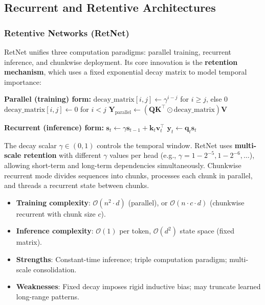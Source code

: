 \documentclass[11pt,a4paper]{article}
\begin{document}
\subsection{Recurrent and Retentive Architectures}

\subsubsection{Retentive Networks (RetNet)}
RetNet \citep{sun_retentive_2023} unifies three computation paradigms: parallel training, recurrent inference, and chunkwise deployment. Its core innovation is the \textbf{retention mechanism}, which uses a fixed exponential decay matrix to model temporal importance:

\begin{algorithmic}[1]
\State \textbf{Parallel (training) form:}
\State $\text{decay\_matrix}[i,j] \gets \gamma^{i-j}$ for $i \geq j$, else $0$ 
\State $\text{decay\_matrix}[i,j] \gets 0$ for $i < j$ 
\State $\mathbf{Y}_{\text{parallel}} \gets (\mathbf{Q}\mathbf{K}^\top \odot \text{decay\_matrix}) \mathbf{V}$ 
\end{algorithmic}

\begin{algorithmic}[1]
\State \textbf{Recurrent (inference) form:}
    \State $\mathbf{s}_t \gets \gamma \mathbf{s}_{t-1} + \mathbf{k}_t \mathbf{v}_t^\top$ 
    \State $\mathbf{y}_t \gets \mathbf{q}_t \mathbf{s}_t$ 
\EndFor
\end{algorithmic}

The decay scalar $\gamma \in (0,1)$ controls the temporal window. RetNet uses \textbf{multi-scale retention} with different $\gamma$ values per head (e.g., $\gamma = 1 - 2^{-5}, 1 - 2^{-6}, \ldots$), allowing short-term and long-term dependencies simultaneously. Chunkwise recurrent mode divides sequences into chunks, processes each chunk in parallel, and threads a recurrent state between chunks.

\begin{itemize}[leftmargin=*]
    \item \textbf{Training complexity}: $\mathcal{O}(n^2 \cdot d)$ (parallel), or $\mathcal{O}(n \cdot c \cdot d)$ (chunkwise recurrent with chunk size $c$).
    \item \textbf{Inference complexity}: $\mathcal{O}(1)$ per token, $\mathcal{O}(d^2)$ state space (fixed matrix).
    \item \textbf{Strengths}: Constant-time inference; triple computation paradigm; multi-scale consolidation.
    \item \textbf{Weaknesses}: Fixed decay imposes rigid inductive bias; may truncate learned long-range patterns.
\end{itemize}
\end{document}
